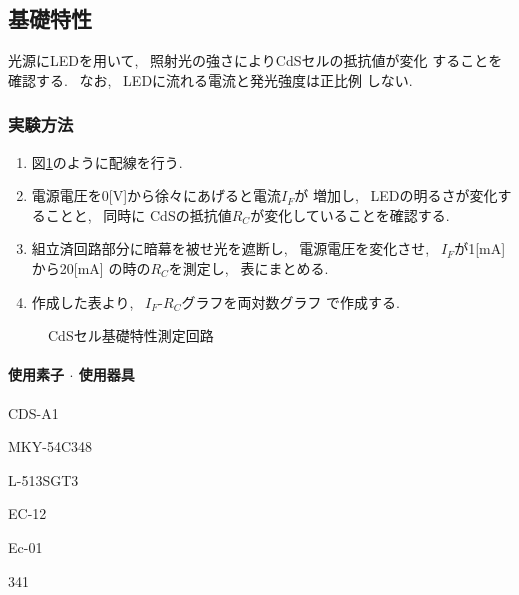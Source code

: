 \documentclass[titlepage]{jsarticle}
\begin{document}
    \subsection{基礎特性}
        光源にLEDを用いて, ~照射光の強さによりCdSセルの抵抗値が変化
        することを確認する. ~なお, ~LEDに流れる電流と発光強度は正比例
        しない.

        \subsubsection{実験方法}
            \begin{enumerate}
                \item 図\ref{fig:基礎特性}のように配線を行う.
                \item 電源電圧を0[V]から徐々にあげると電流$I_F$が
                    増加し, ~LEDの明るさが変化することと, ~同時に
                    CdSの抵抗値$R_C$が変化していることを確認する.
                \item 組立済回路部分に暗幕を被せ光を遮断し,
                    ~電源電圧を変化させ, ~$I_F$が1[mA]から20[mA]
                    の時の$R_C$を測定し, ~表にまとめる.
                \item 作成した表より, ~$I_F$-$R_C$グラフを両対数グラフ
                    で作成する.
            \end{enumerate}

            \begin{figure}[ht]
                \centering
                \caption{CdSセル基礎特性測定回路}
                \label{fig:基礎特性}
            \end{figure}

            \paragraph{使用素子 $\cdot$ 使用器具}
                \begin{description}
                    \setlength{\leftskip}{1.5em}
                    \item[組立済回路] CDS-A1
                    \item[CdSセル] MKY-54C348
                    \item[LED] L-513SGT3
                    \item[デジタルマルチメータ] EC-12
                    \item[直流電源] Ec-01
                    \item[電流計] 341 
                \end{description}
                
\end{document}
